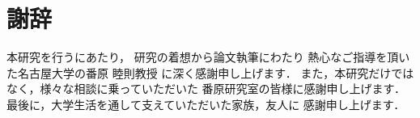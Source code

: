 \chapter*{謝辞}

本研究を行うにあたり，
研究の着想から論文執筆にわたり
熱心なご指導を頂いた名古屋大学の番原 睦則教授
に深く感謝申し上げます．
また，本研究だけではなく，様々な相談に乗っていただいた
番原研究室の皆様に感謝申し上げます．
最後に，大学生活を通して支えていただいた家族，友人に
感謝申し上げます．


